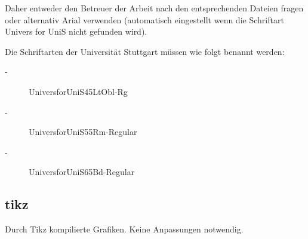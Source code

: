 Daher entweder den Betreuer der Arbeit nach den entsprechenden Dateien fragen oder alternativ Arial verwenden (automatisch eingestellt wenn die Schriftart Univers for UniS nicht gefunden wird).

Die Schriftarten der Universität Stuttgart müssen wie folgt benannt werden:

\begin{description}
	\item[-] UniversforUniS45LtObl-Rg
	\item[-] UniversforUniS55Rm-Regular
	\item[-] UniversforUniS65Bd-Regular
\end{description}

\subsection*{tikz}
Durch Tikz kompilierte Grafiken. Keine Anpassungen notwendig.
